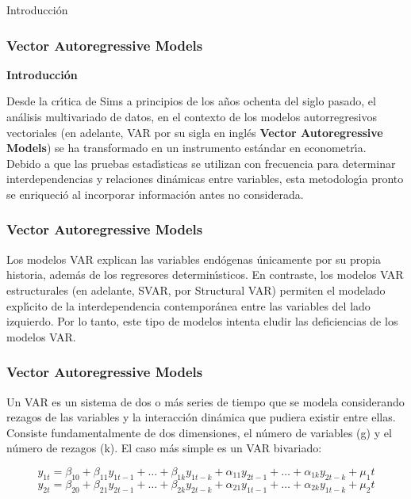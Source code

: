 \documentclass[spanish,xcolor=table]{beamer}
\begin{document}
\begin{section}{Introducci\'on}
\begin{frame}
\frametitle{Vector Autoregressive Models}
\textbf{Introducci\'on}

Desde la cr\'{\i}tica de Sims \cite{sims1980macroeconomics} a principios de los años ochenta del siglo pasado, el an\'alisis multivariado de datos, en el contexto de los modelos autorregresivos vectoriales (en adelante, VAR por su sigla en ingl\'es  \textbf{Vector Autoregressive Models}) se ha transformado en un instrumento est\'andar en econometr\'{\i}a. \\
Debido a que las pruebas estad\'{\i}sticas se utilizan con frecuencia para determinar interdependencias y relaciones din\'amicas entre variables, esta metodolog\'{\i}a pronto se enriqueci\'o al incorporar información antes no considerada. 

\end{frame}

\begin{frame}
\frametitle{Vector Autoregressive Models}

Los modelos VAR explican las variables end\'ogenas \'unicamente por su propia historia, adem\'as de los regresores determin\'{\i}sticos. En contraste, los modelos VAR estructurales (en adelante, SVAR, por Structural VAR) permiten el modelado expl\'{\i}cito de la interdependencia contempor\'anea entre las variables del lado izquierdo. Por lo tanto, este tipo de modelos intenta eludir las deficiencias de los modelos VAR.

\end{frame}
\begin{frame}
\frametitle{Vector Autoregressive Models}

Un VAR es un sistema de dos o m\'as series de tiempo que se modela considerando rezagos de las variables y la interacción din\'amica que pudiera existir entre ellas. Consiste fundamentalmente de dos dimensiones, el n\'umero de variables (g) y el n\'umero de rezagos (k). El caso más simple es un VAR bivariado:

\begin{equation*}
y_{1t} = \beta_{10} + \beta_{11} y_{1t-1} + \dots{} +  \beta_{1k} y_{1t-k} + \alpha_{11} y_{2t-1} + \dots{} +  \alpha_{1k} y_{2t-k} + \mu_1t
\end{equation*}
\begin{equation*}
y_{2t} = \beta_{20} + \beta_{21} y_{2t-1} + \dots{} +  \beta_{2k} y_{2t-k} + \alpha_{21} y_{1t-1} + \dots{} +  \alpha_{2k} y_{1t-k} + \mu_2t
\end{equation*}


\end{frame}
\end{section}
\end{document}
